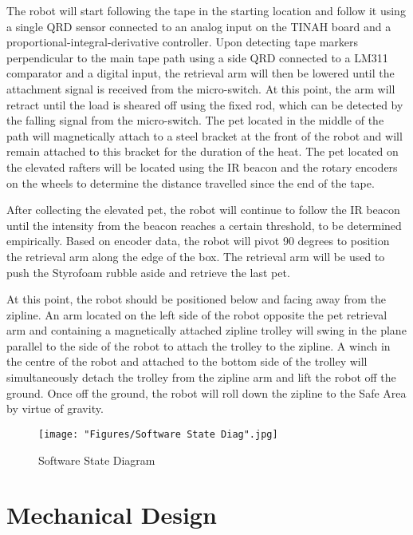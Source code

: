 \documentclass[11pt, oneside]{article} %
\begin{document}
The robot will start following the tape in the starting location and follow it using a single QRD sensor connected to an analog input on the TINAH board and a proportional-integral-derivative controller. Upon detecting tape markers perpendicular to the main tape path using a side QRD connected to a LM311 comparator and a digital input, the retrieval arm will then be lowered until the attachment signal is received from the micro-switch. At this point, the arm will retract until the load is sheared off using the fixed rod, which can be detected by the falling signal from the micro-switch. The pet located in the middle of the path will magnetically attach to a steel bracket at the front of the robot and will remain attached to this bracket for the duration of the heat. The pet located on the elevated rafters will be located using the IR beacon and the rotary encoders on the wheels to determine the distance travelled since the end of the tape.

After collecting the elevated pet, the robot will continue to follow the IR beacon until the intensity from the beacon reaches a certain threshold, to be determined empirically. Based on encoder data, the robot will pivot 90 degrees to position the retrieval arm along the edge of the box. The retrieval arm will be used to push the Styrofoam rubble aside and retrieve the last pet.

At this point, the robot should be positioned below and facing away from the zipline. An arm located on the left side of the robot opposite the pet retrieval arm and containing a magnetically attached zipline trolley will swing in the plane parallel to the side of the robot to attach the trolley to the zipline. A winch in the centre of the robot and attached to the bottom side of the trolley will simultaneously detach the trolley from the zipline arm and lift the robot off the ground. Once off the ground, the robot will roll down the zipline to the Safe Area by virtue of gravity.

\begin{figure}[h]
	\centering
	\texttt{[image: "Figures/Software State Diag".jpg]}
	\caption[Software State Diagram]{Software State Diagram}
	\label{fig:SoftStates}
\end{figure}

\section{Mechanical Design}
\end{document}
